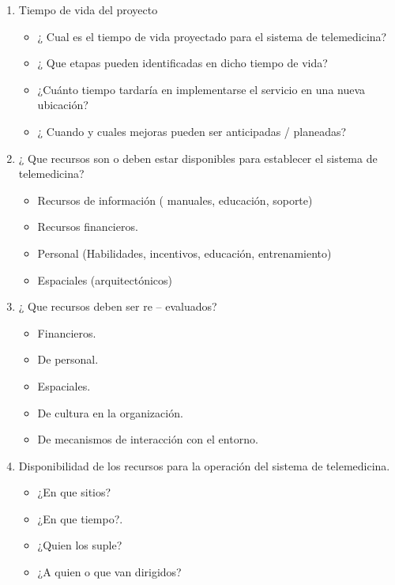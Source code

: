 \begin{enumerate}
\item Tiempo de vida del proyecto

\begin{itemize}
\item ¿ Cual es el tiempo de vida proyectado para el sistema de telemedicina?
\item ¿ Que etapas pueden identificadas en dicho tiempo de vida?
\item ¿Cuánto tiempo tardaría en implementarse el servicio en una nueva ubicación?
\item ¿ Cuando y cuales mejoras pueden ser anticipadas / planeadas?
\end{itemize}
\item  ¿ Que recursos son o deben estar disponibles para establecer el sistema de telemedicina? 

\begin{itemize}
\item Recursos de información ( manuales, educación, soporte)
\item Recursos financieros.
\item Personal (Habilidades, incentivos, educación, entrenamiento) 
\item Espaciales (arquitectónicos)
\end{itemize}

\item  ¿ Que recursos deben ser re – evaluados?

\begin{itemize}
\item Financieros.
\item De personal.
\item Espaciales.
\item De cultura en la organización.
\item De mecanismos de interacción con el entorno.
\end{itemize}


\item Disponibilidad de los recursos para la operación del sistema de telemedicina. 

\begin{itemize}
\item ¿En que sitios? 
\item ¿En que tiempo?.
\item ¿Quien los suple?
\item ¿A quien o que van dirigidos?
\end{itemize}

\end{enumerate}


